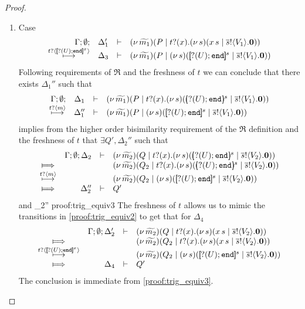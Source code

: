 \begin{proof}
\begin{enumerate}
\begin{enumerate}
					\item	{}Case
						\[
							\mhorel{\Gamma}{\Delta_1'}{\newsp{\widetilde{m_1}}{P \Par \hotrigger{t}{x}{s}{V_1}}}
							{\hby{\bactinp{t}{\map{\btinp{U} \tinact}^{x}}}}
							{\Delta_3}{}{\newsp{\widetilde{m_1}}{P \Par \newsp{s}{\map{\btinp{U} \tinact}^{s} \Par \bout{\dual{s}}{V_1} \inact}}}
						\]
							Following requirements of $\Re$ and the freshness of $t$
							we can conclude that there exists $\Delta_1''$ such that
						\[
							\mhorel{\Gamma}{\Delta_1}{\newsp{\widetilde{m_1}}{P \Par \fotrigger{t}{x}{s}{\btinp{U} \tinact}{V_1}}}
							{\hby{\bactinp{t}{m}}}
							{\Delta_1''}{}{\newsp{\widetilde{m_1}}{P \Par \newsp{s}{\map{\btinp{U} \tinact}^{s} \Par \bout{\dual{s}}{V_1} \inact}}}
						\]
							implies from the higher order bisimilarity requirement of the $\Re$ definition and
							the freshness of $t$ that $\exists Q', \Delta_2''$ such that
							\begin{eqnarray}
								\begin{array}{crll}
									& \Gamma; \es; \Delta_2 & \proves &		
									\newsp{\widetilde{m_2}}{Q \Par \fotrigger{t}{x}{s}{\btinp{U} \tinact}{V_2}}
									\\
									\Hby{} &&&
									\newsp{\widetilde{m_2}}{Q_2 \Par \fotrigger{t}{x}{s}{\btinp{U} \tinact}{V_2}}
									\\
									{\hby{\bactinp{t}{m}}}& & &
									\newsp{\widetilde{m_2}}{Q_2 \Par \newsp{s}{\map{\btinp{U} \tinact}^{s} \Par \bout{\dual{s}}{V_2} \inact}}
									\\
									\Hby{} & \Delta_2'' & \proves & Q'
								\end{array}
								\label{proof:trig_equiv2}
							\end{eqnarray}
							and
							{\fwb}
							{\Delta_2''}{}
							{proof:trig_equiv3}
							The freshness of $t$ allows us to mimic the transitions
							in \eqref{proof:trig_equiv2} to get that for $\Delta_4$
							\begin{eqnarray*}
								\begin{array}{crll}
									& \Gamma; \es; \Delta_2' & \proves &		
									\newsp{\widetilde{m_2}}{Q \Par \hotrigger{t}{x}{s}{V_2}}
									\\
									\Hby{} &&&
									\newsp{\widetilde{m_2}}{Q_2 \Par \hotrigger{t}{x}{s}{V_2}}
									\\
									{\hby{\bactinp{t}{\map{\btinp{U} \tinact}^{x}}}}& & &
									\newsp{\widetilde{m_2}}{Q_2 \Par \newsp{s}{\map{\btinp{U} \tinact}^{s} \Par \bout{\dual{s}}{V_2} \inact}}
									\\
									\Hby{} & \Delta_4 & \proves & Q'
								\end{array}
							\end{eqnarray*}
							The conclusion is immediate from \eqref{proof:trig_equiv3}.


\end{enumerate}
\end{enumerate}
\end{proof}
